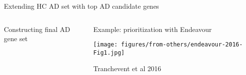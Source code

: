 \documentclass{beamer}
\begin{document}
\begin{frame}{Extending HC AD set with top AD candidate genes}
\begin{columns}[t]
\begin{column}{0.3\textwidth}
\begin{center}
Constructing final AD gene set
\end{center}

\end{column}

\begin{column}{0.75\textwidth}
\begin{center}
Example: prioritization with Endeavour
\end{center}

\texttt{[image: figures/from-others/endeavour-2016-Fig1.jpg]}

\tiny Tranchevent et al 2016
\end{column}
\end{columns}
\end{frame}
\end{document}
